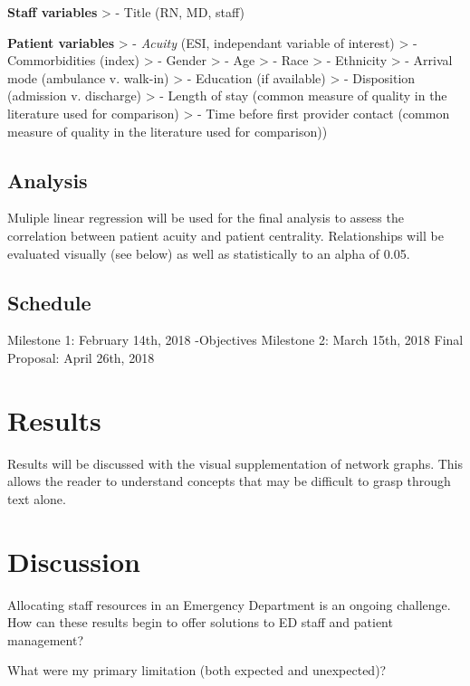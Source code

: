 \documentclass[]{elsarticle} %
\begin{document}
\textbf{Staff variables} \textgreater{} - Title (RN, MD, staff)

\textbf{Patient variables} \textgreater{} - \emph{Acuity} (ESI,
independant variable of interest) \textgreater{} - Commorbidities
(index) \textgreater{} - Gender \textgreater{} - Age \textgreater{} -
Race \textgreater{} - Ethnicity \textgreater{} - Arrival mode (ambulance
v. walk-in) \textgreater{} - Education (if available) \textgreater{} -
Disposition (admission v. discharge) \textgreater{} - Length of stay
(common measure of quality in the literature used for comparison)
\textgreater{} - Time before first provider contact (common measure of
quality in the literature used for comparison))

\subsection{Analysis}\label{analysis}

Muliple linear regression will be used for the final analysis to assess
the correlation between patient acuity and patient centrality.
Relationships will be evaluated visually (see below) as well as
statistically to an alpha of 0.05.

\subsection{Schedule}\label{schedule}

Milestone 1: February 14th, 2018 -Objectives Milestone 2: March 15th,
2018 Final Proposal: April 26th, 2018

\section{Results}\label{results}

Results will be discussed with the visual supplementation of network
graphs. This allows the reader to understand concepts that may be
difficult to grasp through text alone.

\section{Discussion}\label{discussion}

Allocating staff resources in an Emergency Department is an ongoing
challenge. How can these results begin to offer solutions to ED staff
and patient management?

What were my primary limitation (both expected and unexpected)?
\end{document}
